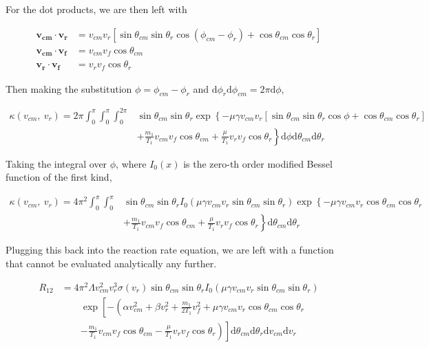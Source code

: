 \documentclass[11pt]{article}
\begin{document}
For the dot products, we are then left with

\begin{align*}
	\mathbf{v_{cm}} \cdot \mathbf{v_r} &= v_{cm} v_r \left[ \sin \theta_{cm} \sin \theta_r \cos \left( \phi_{cm} - \phi_r \right)  + \cos \theta_{cm} \cos \theta_r \right]  \\
	\mathbf{v_{cm}} \cdot \mathbf{v_f} &= v_{cm} v_f \cos \theta_{cm} \\
	\mathbf{v_r} \cdot \mathbf{v_f} &= v_r v_f \cos \theta_r
\end{align*}

Then making the substitution $\phi = \phi_{cm} - \phi_r$ and $\mathrm{d} \phi_r \mathrm{d} \phi_{cm} = 2 \pi \mathrm{d} \phi$,

\begin{align*}
	\kappa(v_{cm},\ v_r) = 2 \pi \int_{0}^{\pi} \int_{0}^{\pi} \int_{0}^{2 \pi} & \sin \theta_{cm} \sin \theta_r \exp \left \lbrace - \mu \gamma v_{cm} v_r \left[ \sin \theta_{cm} \sin \theta_r \cos \phi + \cos \theta_{cm} \cos \theta_r \right] \right. \\
	& \left. + \frac{m_1}{T_1} v_{cm} v_f \cos \theta_{cm} + \frac{\mu}{T_1} v_r v_f \cos \theta_r \right \rbrace \mathrm{d} \phi \mathrm{d} \theta_{cm} \mathrm{d} \theta_r
\end{align*}

Taking the integral over $\phi$, where $I_0(x)$ is the zero-th order modified Bessel function of the first kind,

\begin{align*}
	\kappa(v_{cm},\ v_r) = 4 \pi^2 \int_{0}^{\pi} \int_{0}^{\pi} & \sin \theta_{cm} \sin \theta_r I_0(\mu \gamma v_{cm} v_r \sin \theta_{cm} \sin \theta_r) \exp \left \lbrace - \mu \gamma v_{cm} v_r \cos \theta_{cm} \cos \theta_r \right. \\
	& \left. + \frac{m_1}{T_1} v_{cm} v_f \cos \theta_{cm} + \frac{\mu}{T_1} v_r v_f \cos \theta_r \right \rbrace \mathrm{d} \theta_{cm} \mathrm{d} \theta_r
\end{align*}

Plugging this back into the reaction rate equation, we are left with a function that cannot be evaluated analytically any further.

\begin{align*}
	R_{12} &= 4 \pi^2 \Lambda v_{cm}^2 v_r^3 \sigma(v_r) \sin \theta_{cm} \sin \theta_r I_0(\mu \gamma v_{cm} v_r \sin \theta_{cm} \sin \theta_r) \\
	& \qquad \exp \left[ -\left( \alpha v_{cm}^2 + \beta  v_r^2 + \frac{m_1}{2 T_1} v_f^2 + \mu \gamma v_{cm} v_r \cos \theta_{cm} \cos \theta_r \right. \right. \\
	& \qquad \left. \left. - \frac{m_1}{T_1} v_{cm} v_f \cos \theta_{cm} - \frac{\mu}{T_1} v_r v_f \cos \theta_r \right) \right] \mathrm{d} \theta_{cm} \mathrm{d} \theta_r \mathrm{d} v_{cm} \mathrm{d} v_r
\end{align*}
\end{document}
